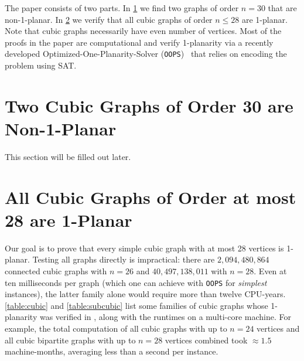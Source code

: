 \documentclass[a4paper,11pt]{article}
\theoremstyle{plain}
\theoremstyle{definition}  %
\newcommand{\oops}{\texttt{OOPS}\xspace}
\begin{document}
The paper consists of two parts. In \cref{sect:ub} we find two graphs of
order $n=30$ that are non-1-planar. In \cref{sect:lb} we verify that
all cubic graphs of order $n \le 28$ are 1-planar. Note that cubic graphs
necessarily have even number of vertices.
Most of the proofs in the paper are computational and verify 1-planarity
via a recently developed Optimized-One-Planarity-Solver (\oops)~\cite{oops} that
relies on encoding the problem using SAT.

\section{Two Cubic Graphs of Order 30 are Non-1-Planar}
\label{sect:ub}

This section will be filled out later.

\section{All Cubic Graphs of Order at most 28 are 1-Planar}
\label{sect:lb}

Our goal is to prove that every simple cubic graph with at most 28 vertices
is 1-planar.  Testing all graphs directly is impractical: there are
$2{,}094{,}480{,}864$ connected cubic graphs with $n=26$ and
$40{,}497{,}138{,}011$ with $n=28$.  Even at ten milliseconds per graph
(which one can achieve with \oops for \emph{simplest} instances),
the latter family alone would require more than twelve CPU-years.
\cref{table:cubic} and \cref{table:subcubic} list some families
of cubic graphs whose 1-planarity was verified in \cite{oops}, along with
the runtimes on a multi-core machine.
For example, the total computation of all cubic graphs with up to $n=24$ vertices and all cubic bipartite graphs with up to $n=28$ vertices combined
took $\approx$$1.5$ machine-months, averaging less than a second per instance.
\end{document}
